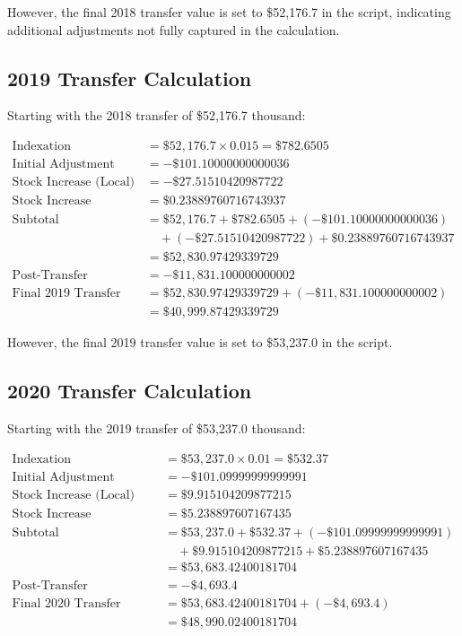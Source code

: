 \documentclass{article}
\begin{document}
However, the final 2018 transfer value is set to \$52,176.7 in the script, indicating additional adjustments not fully captured in the calculation.

\subsection{2019 Transfer Calculation}

Starting with the 2018 transfer of \$52,176.7 thousand:

\begin{align}
\text{Indexation} &= \$52,176.7 \times 0.015 = \$782.6505\\
\text{Initial Adjustment} &= -\$101.10000000000036\\
\text{Stock Increase (Local)} &= -\$27.51510420987722\\
\text{Stock Increase (Delegated)} &= \$0.23889760716743937\\
\text{Subtotal} &= \$52,176.7 + \$782.6505 + (-\$101.10000000000036)\\
&\quad + (-\$27.51510420987722) + \$0.23889760716743937\\
&= \$52,830.97429339729\\
\text{Post-Transfer Adjustment} &= -\$11,831.100000000002\\
\text{Final 2019 Transfer} &= \$52,830.97429339729 + (-\$11,831.100000000002)\\
&= \$40,999.87429339729
\end{align}

However, the final 2019 transfer value is set to \$53,237.0 in the script.

\subsection{2020 Transfer Calculation}

Starting with the 2019 transfer of \$53,237.0 thousand:

\begin{align}
\text{Indexation} &= \$53,237.0 \times 0.01 = \$532.37\\
\text{Initial Adjustment} &= -\$101.09999999999991\\
\text{Stock Increase (Local)} &= \$9.915104209877215\\
\text{Stock Increase (Delegated)} &= \$5.238897607167435\\
\text{Subtotal} &= \$53,237.0 + \$532.37 + (-\$101.09999999999991)\\
&\quad + \$9.915104209877215 + \$5.238897607167435\\
&= \$53,683.42400181704\\
\text{Post-Transfer Adjustment} &= -\$4,693.4\\
\text{Final 2020 Transfer} &= \$53,683.42400181704 + (-\$4,693.4)\\
&= \$48,990.02400181704
\end{align}
\end{document}
